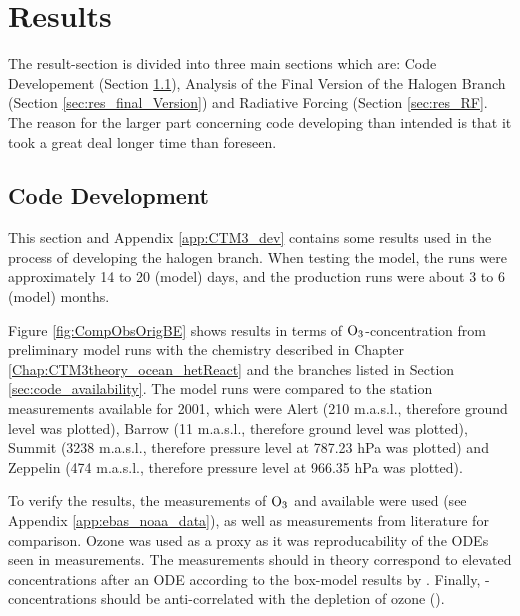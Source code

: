 \setcounter{chapter}{5}
\chapter{Results}\label{chap:results}

The result-section is divided into three main sections which are: Code Developement (Section \ref{sec:results_code_development}), Analysis of the Final Version of the Halogen Branch (Section \ref{sec:res_final_Version}) and Radiative Forcing (Section \ref{sec:res_RF}. The reason for the larger part concerning code developing than intended is that it took a great deal longer time than foreseen. 


\section{Code Development}\label{sec:results_code_development}

This section and Appendix \ref{app:CTM3_dev} contains some results used in the process of developing the halogen branch. When testing the model, the runs were approximately 14 to 20 (model) days, and the production runs were about 3 to 6 (model) months.

\medskip

Figure \ref{fig:CompObsOrigBE} shows results in terms of $\mathrm{O_3}$-concentration from preliminary model runs with the chemistry described in Chapter \ref{Chap:CTM3theory_ocean_hetReact} and the branches listed in Section \ref{sec:code_availability}. The model runs were compared to the station measurements available for 2001, which were Alert (210 m.a.s.l., therefore ground level was plotted), Barrow (11 m.a.s.l., therefore ground level was plotted), Summit (3238 m.a.s.l., therefore pressure level at 787.23 hPa was plotted) and Zeppelin (474 m.a.s.l., therefore pressure level at 966.35 hPa was plotted). 

\medskip

To verify the results, the measurements of $\mathrm{O_3}$ and  available were used (see Appendix \ref{app:ebas_noaa_data}), as well as  measurements from literature for comparison. Ozone was used as a proxy as it was reproducability of the ODEs seen in measurements. The  measurements should in theory correspond to elevated concentrations after an ODE according to the box-model results by \cite{CAO}. Finally, -concentrations should be anti-correlated with the depletion of ozone (\cite{barrie}). 

\medskip

